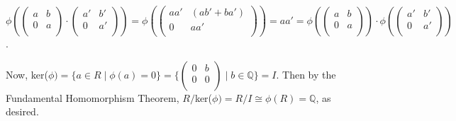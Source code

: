     $\phi(\left(%
    \begin{array}{cc}
      a & b \\
      0 & a \\
    \end{array}%
    \right) \cdot \left(%
    \begin{array}{cc}
      a' & b' \\
      0 & a' \\
    \end{array}%
    \right)) = \phi(\left(%
    \begin{array}{cc}
      aa' & (ab'+ba') \\
      0 & aa' \\
    \end{array}%
    \right)) = aa' = \phi(\left(%
    \begin{array}{cc}
      a & b \\
      0 & a \\
    \end{array}%
    \right)) \cdot \phi(\left(%
    \begin{array}{cc}
      a' & b' \\
      0 & a' \\
    \end{array}%
    \right))$.
    
    Now, ker($\phi) = \{ a \in R \mid \phi(a) = 0 \} = \{ \left(%
\begin{array}{cc}
  0 & b \\
  0 & 0 \\
\end{array}%
\right) \mid b \in \mathbb{Q} \} = I$. Then by the Fundamental Homomorphism Theorem, $R/$ker($\phi) = R/I \cong \phi(R) = \mathbb{Q}$, as desired.
